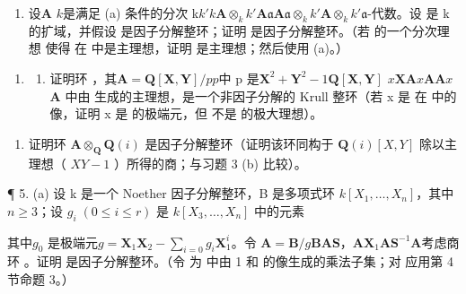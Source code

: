 \begin{enumerate}
\def\labelenumi{(\alph{enumi})}
\setcounter{enumi}{1}
\tightlist
\item
  设\(\mathbf{A}\)  \(k\)是满足 (a) 条件的分次 k\(k'\)\(k\)\(\mathbf{A} \otimes_k k'\)\(\mathbf{A}\)\(\mathfrak{a}\)\(\mathbf{A}\)\(\mathfrak{a} \otimes_k k'\)\(\mathbf{A} \otimes_k k'\)\(\mathfrak{a}\)-代数。设  是 k 的扩域，并假设  是因子分解整环；证明  是因子分解整环。（若  的一个分次理想  使得  在  中是主理想，证明  是主理想；然后使用 (a)。）
\end{enumerate}

\begin{enumerate}
\def\labelenumi{\arabic{enumi}.}
\setcounter{enumi}{3}
\tightlist
\item
  \begin{enumerate}
  \def\labelenumii{(\alph{enumii})}
  \tightlist
  \item
    证明环 ，其\(\mathbf{A} = \mathbf{Q}[\mathbf{X},\mathbf{Y}] / p\)\(p\)中 p 是\(\mathbf{X}^2 +\mathbf{Y}^2 -1\)\(\mathbf{Q}[\mathbf{X},\mathbf{Y}]\) \(x\)\(\mathbf{X}\)\(\mathbf{A}\)\(x\)\(\mathbf{A}\)\(\mathbf{A}x\)\(\mathbf{A}\) 中由  生成的主理想，是一个非因子分解的 Krull 整环（若 x 是  在  中的像，证明 x 是  的极端元，但  不是  的极大理想）。
  \end{enumerate}
\end{enumerate}

\begin{enumerate}
\def\labelenumi{(\alph{enumi})}
\setcounter{enumi}{1}
\tightlist
\item
  证明环 \(\mathbf{A} \otimes_{\mathbf{Q}} \mathbf{Q}(i)\) 是因子分解整环（证明该环同构于 \(\mathbf{Q}(i) [X, Y]\) 除以主理想（ \(XY - 1\) ）所得的商；与习题 3 (b) 比较）。
\end{enumerate}

¶ 5. (a) 设 k 是一个 Noether 因子分解整环，B 是多项式环 \(k[X_{1},\ldots,X_{n}]\)，其中 \(n\geqslant3\)；设 \(g_{i}\;(0\leqslant i\leqslant r)\) 是 \(k[X_{3},\ldots,X_{n}]\) 中的元素

其中\(g_0\)  是极端元\(g = \mathbf{X}_1\mathbf{X}_2 - \sum_{i=0} g_i\mathbf{X}_1^i\)。令 \(\mathbf{A} = \mathbf{B}/g\mathbf{B}\)\(\mathbf{A}\)\(\mathbf{S}\)，\(\mathbf{A}\)\(\mathbf{X}_1\)\(\mathbf{A}\)\(\mathbf{S}^{-1}\mathbf{A}\)考虑商环 。证明  是因子分解整环。（令  为  中由 1 和  的像生成的乘法子集；对  应用第 4 节命题 3。）

